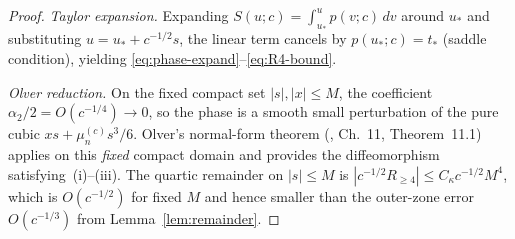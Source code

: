 \documentclass[12pt,a4paper]{amsart}
\theoremstyle{definition}
\theoremstyle{remark}
\newcommand{\ustar}{u_*}
\newcommand{\tstar}{t_*}
\begin{document}
\begin{proof}
\textit{Taylor expansion.}
Expanding $S(u;c) = \int_{\ustar}^u p(v;c)\,dv$
around $\ustar$ and substituting
$u = \ustar + c^{-1/2}s$,
the linear term cancels by
$p(\ustar;c) = \tstar$ (saddle condition),
yielding \eqref{eq:phase-expand}--\eqref{eq:R4-bound}.

\textit{Olver reduction.}
On the fixed compact set $|s|, |x| \le M$,
the coefficient $\alpha_2/2 = O(c^{-1/4}) \to 0$,
so the phase is a smooth small perturbation
of the pure cubic $xs + \mu_n^{(c)}s^3/6$.
Olver's normal-form theorem
(\cite{Olver1974}, Ch.~11, Theorem~11.1)
applies on this \emph{fixed} compact domain
and provides the diffeomorphism satisfying~(i)--(iii).
The quartic remainder on $|s| \le M$
is $|c^{-1/2}R_{\ge 4}| \le C_\kappa c^{-1/2}M^4$,
which is $O(c^{-1/2})$ for fixed $M$
and hence smaller than the outer-zone error
$O(c^{-1/3})$ from Lemma~\ref{lem:remainder}.
\end{proof}
\end{document}
